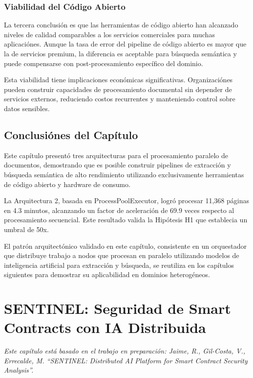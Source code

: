\documentclass[12pt,a4paper,twoside]{book}
\begin{document}
\subsection{Viabilidad del Código Abierto}

La tercera conclusión es que las herramientas de código abierto han alcanzado niveles de calidad comparables a los servicios comerciales para muchas aplicaciónes. Aunque la tasa de error del pipeline de código abierto es mayor que la de servicios premium, la diferencia es aceptable para búsqueda semántica y puede compensarse con post-procesamiento específico del dominio.

Esta viabilidad tiene implicaciones económicas significativas. Organizaciónes pueden construir capacidades de procesamiento documental sin depender de servicios externos, reduciendo costos recurrentes y manteniendo control sobre datos sensibles.

\section{Conclusiónes del Capítulo}

Este capítulo presentó tres arquitecturas para el procesamiento paralelo de documentos, demostrando que es posible construir pipelines de extracción y búsqueda semántica de alto rendimiento utilizando exclusivamente herramientas de código abierto y hardware de consumo.

La Arquitectura 2, basada en ProcessPoolExecutor, logró procesar 11,368 páginas en 4.3 minutos, alcanzando un factor de aceleración de 69.9 veces respecto al procesamiento secuencial. Este resultado valida la Hipótesis H1 que establecia un umbral de 50x.

El patrón arquitectónico validado en este capítulo, consistente en un orquestador que distribuye trabajo a nodos que procesan en paralelo utilizando modelos de inteligencia artificial para extracción y búsqueda, se reutiliza en los capítulos siguientes para demostrar su aplicabilidad en dominios heterogéneos.


\chapter{SENTINEL: Seguridad de Smart Contracts con IA Distribuida}
\label{cap:sentinel}

\begin{center}
\textit{Este capítulo está basado en el trabajo en preparación: Jaime, R., Gil-Costa, V., Errecalde, M. ``SENTINEL: Distributed AI Platform for Smart Contract Security Analysis''.}
\end{center}
\end{document}
